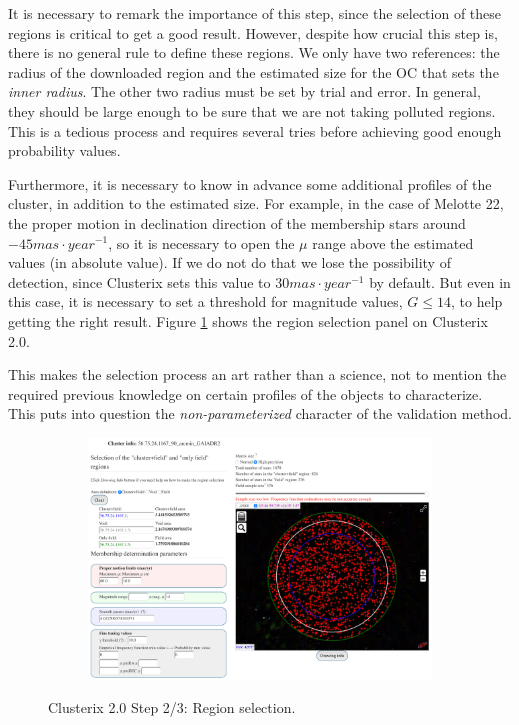 \documentclass[11pt, a4paper, english]{book}
\begin{document}
It is necessary to remark the importance of this step,
since the selection of these regions is critical to get a good result.
However, despite how crucial this step is, there is no general rule to define these regions.
We only have two references:
the radius of the downloaded region and the estimated size for the OC that sets the \emph{inner radius}.
The other two radius must be set by trial and error.
In general, they should be large enough to be sure that we are not taking polluted regions.
This is a tedious process and requires several tries before achieving good enough probability values.

Furthermore, it is necessary to know in advance some additional profiles of the cluster,
in addition to the estimated size.
For example, in the case of Melotte 22, the proper motion in declination direction
of the membership stars around $-45 mas \cdot year^{-1}$,
so it is necessary to open the $\mu$ range above the estimated values (in absolute value).
If we do not do that we lose the possibility of detection,
since Clusterix sets this value to $30 mas \cdot year^{-1}$ by default.
But even in this case, it is necessary to set a threshold for magnitude values,
$G \leq 14$, to help getting the right result.
Figure \ref{fig:clusterix_step2_melotte_22} shows the region selection panel on Clusterix 2.0.

This makes the selection process an art rather than a science,
not to mention the required previous knowledge on certain profiles of the objects to characterize.
This puts into question the \emph{non-parameterized} character of the validation method.

\begin{figure}[htbp]
  \centering
  \begin{subfigure}{0.9\textwidth}
    \centering
    \includegraphics[width=\textwidth]{../figures/clusterix/clusterix_step2_melotte_22.png}
  \end{subfigure}
  \caption{Clusterix 2.0 Step 2/3: Region selection.}
  \label{fig:clusterix_step2_melotte_22}
\end{figure}
\end{document}

